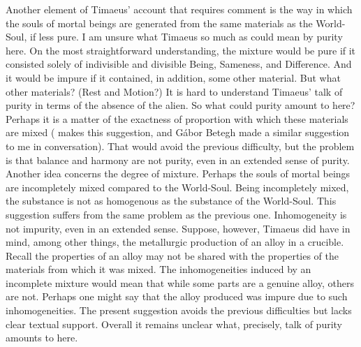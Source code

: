 Another element of Timaeus' account that requires comment is the way in which the souls of mortal beings are generated from the same materials as the World-Soul, if less pure. I am unsure what Timaeus so much as could mean by purity here. On the most straightforward understanding, the mixture would be pure if it consisted solely of indivisible and divisible Being, Sameness, and Difference. And it would be impure if it contained, in addition, some other material. But what other materials? (Rest and Motion?) It is hard to understand Timaeus' talk of purity in terms of the absence of the alien. So what could purity amount to here? Perhaps it is a matter of the exactness of proportion with which these materials are mixed (\citealt[141 n11]{Archer-Hind:1888qd} makes this suggestion, and Gábor Betegh made a similar suggestion to me in conversation). That would avoid the previous difficulty, but the problem is that balance and harmony are not purity, even in an extended sense of purity. Another idea concerns the degree of mixture. Perhaps the souls of mortal beings are incompletely mixed compared to the World-Soul. Being incompletely mixed, the substance is not as homogenous as the substance of the World-Soul. This suggestion suffers from the same problem as the previous one. Inhomogeneity is not impurity, even in an extended sense. Suppose, however, Timaeus did have in mind, among other things, the metallurgic production of an alloy in a crucible. Recall the properties of an alloy may not be shared with the properties of the materials from which it was mixed. The inhomogeneities induced by an incomplete mixture would mean that while some parts are a genuine alloy, others are not. Perhaps one might say that the alloy produced was impure due to such inhomogeneities. The present suggestion avoids the previous difficulties but lacks clear textual support. Overall it remains unclear what, precisely, talk of purity amounts to here.

